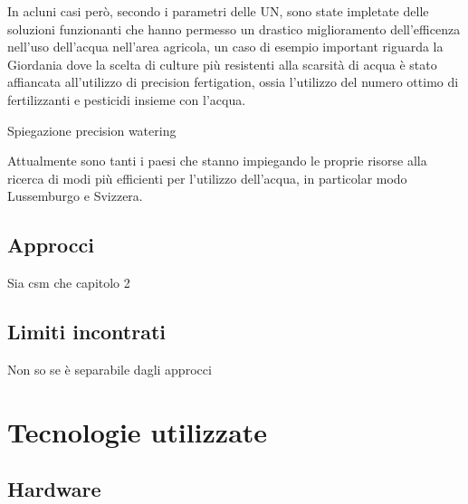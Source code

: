 \documentclass[12pt,a4paper,openright,twoside]{book}
\begin{document}
In acluni casi però, secondo i parametri delle \ac{UN}, sono state impletate delle soluzioni funzionanti che hanno permesso un drastico miglioramento dell'efficenza nell'uso dell'acqua nell'area agricola, un caso di esempio important riguarda la Giordania dove la scelta di culture più resistenti alla scarsità di acqua è stato affiancata all'utilizzo di precision fertigation, ossia l'utilizzo del numero ottimo di fertilizzanti e pesticidi insieme con l'acqua.

Spiegazione precision watering

Attualmente sono tanti i paesi che stanno impiegando le proprie risorse alla ricerca di modi più efficienti per l'utilizzo dell'acqua, in particolar modo Lussemburgo e Svizzera. \cite{SDG-6-Progress}

\section{Approcci}

Sia csm che capitolo 2

\section{Limiti incontrati}

Non so se è separabile dagli approcci

\chapter{Tecnologie utilizzate}



\section{Hardware}
\end{document}
